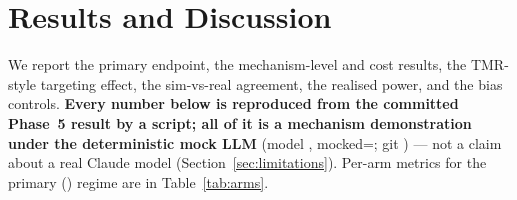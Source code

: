 \section{Results and Discussion}\label{sec:results}

We report the primary endpoint, the mechanism-level and cost results, the
TMR-style targeting effect, the sim-vs-real agreement, the realised power, and
the bias controls. \textbf{Every number below is reproduced from the committed
Phase~5 result by a script; all of it is a mechanism demonstration under the
deterministic mock LLM} (model \texttt{\SWmodelID}, mocked=\SWmodelMocked;
git \texttt{\SWgitCommit}) --- not a claim about a real Claude model
(Section~\ref{sec:limitations}). Per-arm metrics for the primary
(\SWprimaryRegime) regime are in Table~\ref{tab:arms}.

\begin{table}[t]\centering
  \caption{Per-arm metrics in the primary (\SWprimaryRegime{}) regime: final
  average accuracy (ACC), backward and forward transfer (BWT, FWT),
  mechanism-level prune precision/recall/F1 against ground-truth relevance,
  final memory-vector count, and total tokens (thousands). Means over
  $n=\SWnSeeds$ seeds. The \texttt{oracle} arm (prune exactly the injected
  distractors) and \texttt{long\_context} (no pruning) are ceilings/baselines,
  not deployable treatments. Forward transfer (FWT) is identically zero for every
  arm: with independent per-task fact sets and a zero pre-exposure baseline, no
  task can be answered before its own material is ingested, so the
  just-above-diagonal accuracies vanish by construction; we report the column for
  completeness as part of the standard ACC/BWT/FWT
  suite~\citep{lopezpaz2017gem}, not as a metric that discriminates arms here.
  \MockCaveat}
  \label{tab:arms}
  \small
  
\end{table}

